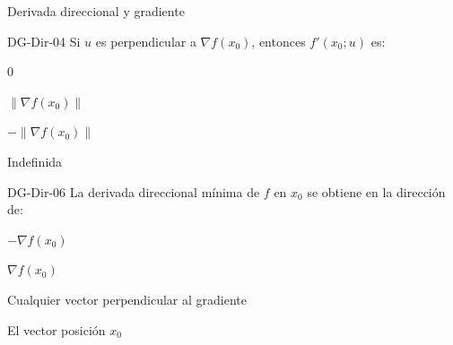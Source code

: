 \documentclass[a4,11pt]{aleph-notas}
\begin{document}
\begin{quiz}{Derivada direccional y gradiente}
\begin{multi}[]%
    {DG-Dir-04}
    Si ${u}$ es perpendicular a $\nabla f({x}_0)$, entonces $f'({x}_0;{u})$ es:
    \item* $0$
    \item $\|\nabla f({x}_0)\|$
    \item $-\|\nabla f({x}_0)\|$
    \item Indefinida
\end{multi}

\begin{multi}[]%
    {DG-Dir-06}
    La derivada direccional mínima de $f$ en ${x}_0$ se obtiene en la dirección de:
    \item* $-\nabla f({x}_0)$
    \item $\nabla f({x}_0)$
    \item Cualquier vector perpendicular al gradiente
    \item El vector posición ${x}_0$
\end{multi}

\end{quiz}
\end{document}
